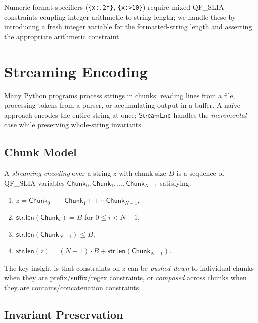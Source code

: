 \documentclass[11pt]{article}
\newcommand{\StreamEnc}{\ensuremath{\mathsf{StreamEnc}}}
\newcommand{\QFSLIA}{\textsf{QF\_SLIA}}
\newcommand{\strlen}[1]{\ensuremath{\mathsf{str.len}(#1)}}
\newcommand{\strconcat}[2]{\ensuremath{#1 \mathbin{+\!\!+} #2}}
\newcommand{\Chunk}{\ensuremath{\mathsf{Chunk}}}
\begin{document}
\begin{remark}
Numeric format specifiers (\texttt{\{x:.2f\}}, \texttt{\{x:>10\}}) require
mixed \QFSLIA{} constraints coupling integer arithmetic to string length; we
handle these by introducing a fresh integer variable for the formatted-string
length and asserting the appropriate arithmetic constraint.
\end{remark}

\section{Streaming Encoding}
\label{sec:streaming}

Many Python programs process strings in chunks: reading lines from a file,
processing tokens from a parser, or accumulating output in a buffer.  A
na\"ive approach encodes the entire string at once; \StreamEnc{} handles the
\emph{incremental} case while preserving whole-string invariants.

\subsection{Chunk Model}
\label{sec:chunk-model}

\begin{definition}
\label{def:stream}
A \emph{streaming encoding} over a string $z$ with chunk size $B$ is a
sequence of \QFSLIA{} variables
$\Chunk_0, \Chunk_1, \ldots, \Chunk_{N-1}$
satisfying:
\begin{enumerate}
  \item $z = \strconcat{\Chunk_0}{\strconcat{\Chunk_1}{\cdots \Chunk_{N-1}}}$,
  \item $\strlen{\Chunk_i} = B$ for $0 \leq i < N-1$,
  \item $\strlen{\Chunk_{N-1}} \leq B$,
  \item $\strlen{z} = (N-1) \cdot B + \strlen{\Chunk_{N-1}}$.
\end{enumerate}
\end{definition}

The key insight is that constraints on $z$ can be \emph{pushed down} to
individual chunks when they are prefix/suffix/regex constraints, or
\emph{composed} across chunks when they are contains/concatenation constraints.

\subsection{Invariant Preservation}
\label{sec:stream-invariant}
\end{document}

